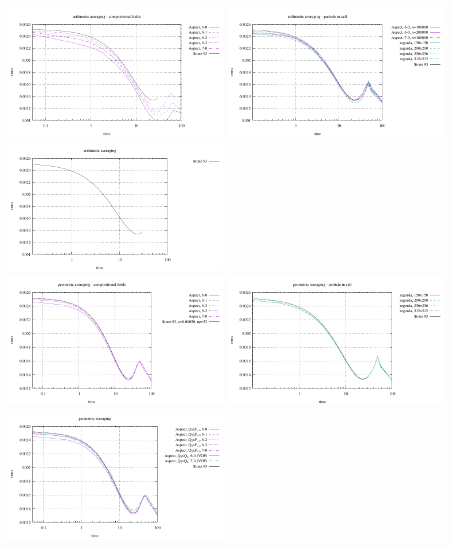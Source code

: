 \begin{center}
\includegraphics[width=5.7cm]{images/stokes_sphere_fs2D/vrms_arithm_comp}
\includegraphics[width=5.7cm]{images/stokes_sphere_fs2D/vrms_arithm_pic}
\includegraphics[width=5.7cm]{images/stokes_sphere_fs2D/vrms_arithm_add}\\
\includegraphics[width=5.7cm]{images/stokes_sphere_fs2D/vrms_geom_comp}
\includegraphics[width=5.7cm]{images/stokes_sphere_fs2D/vrms_geom_pic}
\includegraphics[width=5.7cm]{images/stokes_sphere_fs2D/vrms_geom_add}\\

\end{center}
